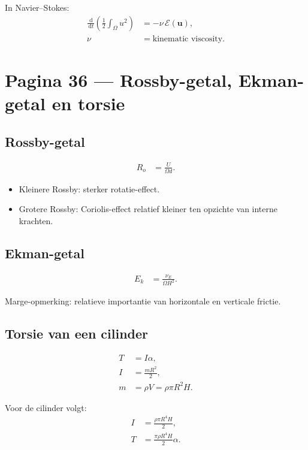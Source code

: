 \documentclass[11pt]{article}
\newcommand{\dd}{\,\mathrm{d}}
\newcommand{\vect}[1]{\mathbf{#1}}
\begin{document}
In Navier--Stokes:
\begin{align*}
\frac{\dd}{\dd t}
\left(
\frac{1}{2}\int_{\Omega}u^2
\right)
&=
-\nu\,\mathcal{E}\left(\vect{u}\right),
\\
\nu
&=
\text{kinematic viscosity}.
\end{align*}

\newpage

\section*{Pagina 36 --- Rossby-getal, Ekman-getal en torsie}

\subsection*{Rossby-getal}

\begin{align*}
R_o
  &=
  \frac{U}{\Omega d}.
\end{align*}

\begin{itemize}
\item Kleinere Rossby: sterker rotatie-effect.
\item Grotere Rossby: Coriolis-effect relatief kleiner ten opzichte van interne krachten.
\end{itemize}

\subsection*{Ekman-getal}

\begin{align*}
E_k
  &=
  \frac{\nu_E}{\Omega H^2}.
\end{align*}

Marge-opmerking: relatieve importantie van horizontale en verticale frictie.

\subsection*{Torsie van een cilinder}

\begin{align*}
T
  &=
  I\alpha,
\\
I
  &=
  \frac{mR^2}{2},
\\
m
  &=
  \rho V
  =
  \rho\pi R^2 H.
\end{align*}

Voor de cilinder volgt:
\begin{align*}
I
&=
\frac{\rho\pi R^4H}{2},
\\
T
&=
\frac{\pi\rho R^4H}{2}\alpha.
\end{align*}
\end{document}
